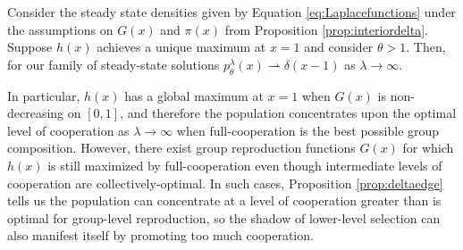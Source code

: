 \documentclass[11pt]{article}
\numberwithin{equation}{section}
\begin{document}
{ \begin{proposition} \label{prop:deltaedge}
 Consider the steady state densities given by Equation \eqref{eq:Laplacefunctions} under the assumptions on $G(x)$ and $\pi(x)$ from Proposition \ref{prop:interiordelta}. Suppose $h(x)$ achieves a unique maximum at $x = 1$ and consider $\theta > 1$. Then, for our family of steady-state solutions $p^{\lambda}_{\theta}(x) \rightharpoonup \delta(x-1)$ as $\lambda \to \infty$.
 \end{proposition}
 In particular, $h(x)$ has a global maximum at $x=1$ when $G(x)$ is non-decreasing on $[0,1]$, and therefore the population concentrates  upon the optimal level of cooperation as $\lambda \to \infty$ when full-cooperation is the best possible group composition. However, there exist group reproduction functions $G(x)$ for which$h(x)$ is still maximized by full-cooperation even though intermediate levels of cooperation are collectively-optimal. In such cases,  Proposition \ref{prop:deltaedge} tells us the population can concentrate at a level of cooperation greater than is optimal for group-level reproduction, so the %
 shadow of lower-level selection can also manifest itself by promoting too much cooperation.  
 

}
\end{document}
